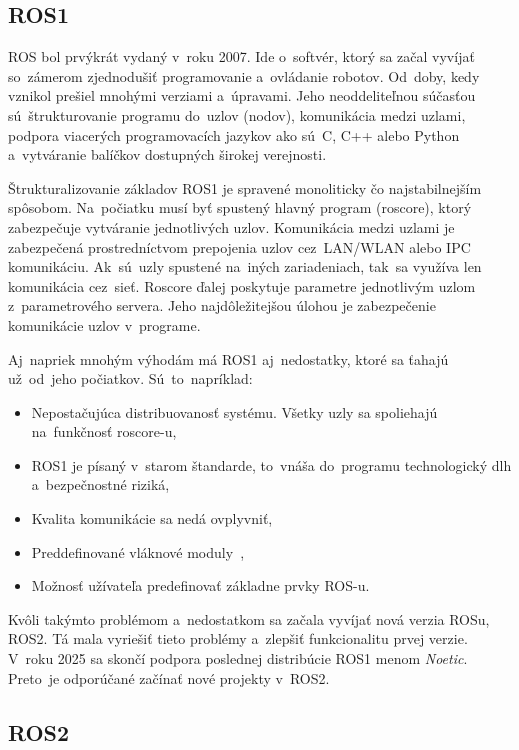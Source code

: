 \subsection{ROS1}

ROS bol prvýkrát vydaný v~roku 2007. Ide o~softvér, ktorý sa začal vyvíjať so~zámerom zjednodušiť programovanie a~ovládanie robotov.
Od~doby, kedy vznikol prešiel mnohými verziami a~úpravami. Jeho neoddeliteľnou súčasťou sú~štrukturovanie programu do~uzlov (nodov),
komunikácia medzi uzlami, podpora viacerých programovacích jazykov ako sú~C, C++ alebo Python a~vytváranie balíčkov dostupných širokej
verejnosti.

Štrukturalizovanie základov ROS1 je spravené monoliticky čo najstabilnejším spôsobom. Na~počiatku musí byť spustený hlavný program (roscore),
ktorý zabezpečuje vytváranie jednotlivých uzlov. Komunikácia medzi uzlami je zabezpečená prostredníctvom prepojenia uzlov cez~LAN/WLAN
alebo IPC komunikáciu. Ak~sú~uzly spustené na~iných zariadeniach, tak~sa využíva len komunikácia cez~sieť. Roscore ďalej poskytuje parametre
jednotlivým uzlom z~parametrového servera. Jeho najdôležitejšou úlohou je zabezpečenie komunikácie uzlov v~programe.

Aj~napriek mnohým výhodám má ROS1 aj~nedostatky, ktoré sa ťahajú už~od~jeho počiatkov. Sú~to~napríklad:

\begin{itemize}
	\item Nepostačujúca distribuovanosť systému. Všetky uzly sa spoliehajú na~funkčnosť roscore-u,
	\item ROS1 je písaný v~starom štandarde, to~vnáša do~programu technologický dlh a~bezpečnostné riziká,
	\item Kvalita komunikácie sa nedá ovplyvniť,
	\item Preddefinované vláknové moduly~\cite{ROS2design},
	\item Možnosť užívateľa predefinovať základne prvky ROS-u.
\end{itemize}

Kvôli takýmto problémom a~nedostatkom sa začala vyvíjať nová verzia ROSu, ROS2. Tá mala vyriešiť tieto problémy a~zlepšiť funkcionalitu
prvej verzie. V~roku 2025 sa skončí podpora poslednej distribúcie ROS1 menom \textit{Noetic}. Preto~je odporúčané začínať nové projekty
v~ROS2.

\subsection{ROS2}

